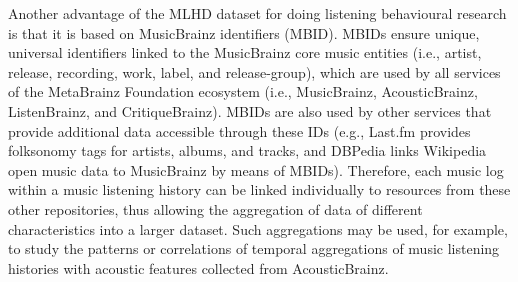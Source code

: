 Another advantage of the MLHD dataset for doing listening behavioural research is that it is based on MusicBrainz identifiers (MBID). MBIDs ensure unique, universal identifiers linked to the MusicBrainz core music entities (i.e., artist, release, recording, work, label, and release-group), which are used by all services of the MetaBrainz Foundation ecosystem (i.e., MusicBrainz, AcousticBrainz, ListenBrainz, and CritiqueBrainz). MBIDs are also used by other services that provide additional data accessible through these IDs (e.g., Last.fm provides folksonomy tags for artists, albums, and tracks, and DBPedia links Wikipedia open music data to MusicBrainz by means of MBIDs). Therefore, each music log within a music listening history can be linked individually to resources from these other repositories, thus allowing the aggregation of data of different characteristics into a larger dataset.
Such aggregations may be used, for example, to study the patterns or correlations of temporal aggregations of music listening histories with acoustic features collected from AcousticBrainz. 







